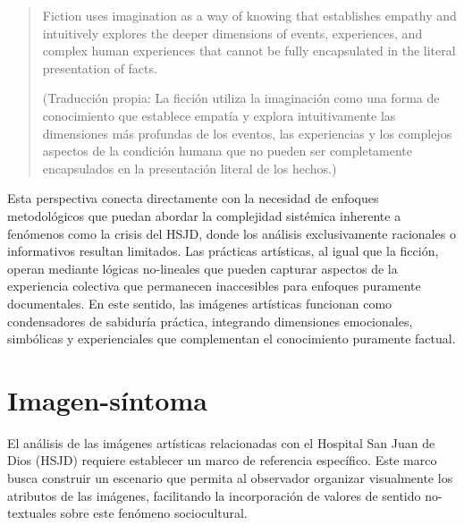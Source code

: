 \begin{quote}
    Fiction uses imagination as a way of knowing that establishes empathy and intuitively explores the deeper dimensions of events, experiences, and complex human experiences that cannot be fully encapsulated in the literal presentation of facts. \parencite[p. 30]{Leavy2018}
    
    \footnotesize
    (Traducción propia: La ficción utiliza la imaginación como una forma de conocimiento que establece empatía y explora intuitivamente las dimensiones más profundas de los eventos, las experiencias y los complejos aspectos de la condición humana que no pueden ser completamente encapsulados en la presentación literal de los hechos.)
    \normalsize
\end{quote}

Esta perspectiva conecta directamente con la necesidad de enfoques metodológicos que puedan abordar la complejidad sistémica inherente a fenómenos como la crisis del HSJD, donde los análisis exclusivamente racionales o informativos resultan limitados. Las prácticas artísticas, al igual que la ficción, operan mediante lógicas no-lineales que pueden capturar aspectos de la experiencia colectiva que permanecen inaccesibles para enfoques puramente documentales. En este sentido, las imágenes artísticas funcionan como condensadores de sabiduría práctica, integrando dimensiones emocionales, simbólicas y experienciales que complementan el conocimiento puramente factual.

\section{Imagen-síntoma}

El análisis de las imágenes artísticas relacionadas con el Hospital San Juan de Dios (HSJD) requiere establecer un marco de referencia específico. Este marco busca construir un escenario que permita al observador organizar visualmente los atributos de las imágenes, facilitando la incorporación de valores de sentido no-textuales sobre este fenómeno sociocultural.

